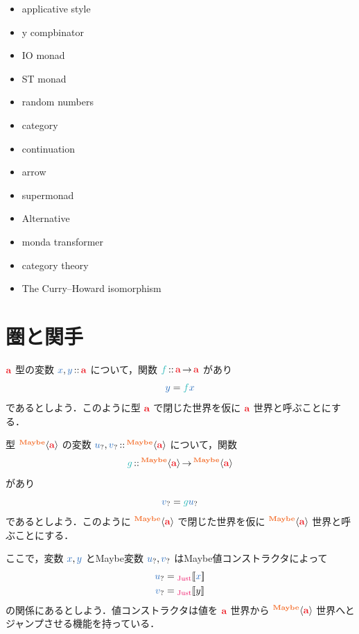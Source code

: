 \documentclass[a5paper,twoside,fleqn,draft]{jsbook}
\begin{document}
\begin{itemize}
\item applicative style
\item y compbinator
\item IO monad
\item ST monad
\item random numbers
\item category
\item continuation
\item arrow
\item supermonad
\item Alternative
\item monda transformer
\item category theory
\item The Curry–Howard isomorphism
\end{itemize}


\section{圏と関手}

$\hTypeName{a}$ 型の変数 $\hVar{x},\hVar{y}\hIsTypeOf\hTypeName{a}$ について，関数 $\hFunc{f}\hIsTypeOf\hTypeName{a}\hFunctionArrow\hTypeName{a}$ があり
\begin{equation}
  \hVar{y}
  =\hFunc{f}\hVar{x}
\end{equation}
であるとしよう．このように型 $\hTypeName{a}$ で閉じた世界を仮に $\hTypeName{a}$ 世界と呼ぶことにする．

型 $\hMaybeConstruct{\hTypeName{a}}$ の変数 $\hMaybeVar{u},\hMaybeVar{v}\hIsTypeOf\hMaybeConstruct{\hTypeName{a}}$ について，関数
\begin{equation}
  \hFunc{g}
  \hIsTypeOf\hMaybeConstruct{\hTypeName{a}}\hFunctionArrow\hMaybeConstruct{\hTypeName{a}}
\end{equation}
があり
\begin{equation}
  \hMaybeVar{v}
  =\hFunc{g}\hMaybeVar{u}
\end{equation}
であるとしよう．このように $\hMaybeConstruct{\hTypeName{a}}$ で閉じた世界を仮に $\hMaybeConstruct{\hTypeName{a}}$ 世界と呼ぶことにする．

ここで，変数 $\hVar{x},\hVar{y}$ とMaybe変数 $\hMaybeVar{u},\hMaybeVar{v}$ はMaybe値コンストラクタによって
\begin{align}
  \hMaybeVar{u}
  &=\hJustWith{\hVar{x}}\\
  \hMaybeVar{v}
  &=\hJustWith{y}
\end{align}
の関係にあるとしよう．値コンストラクタは値を $\hTypeName{a}$ 世界から $\hMaybeConstruct{\hTypeName{a}}$ 世界へとジャンプさせる機能を持っている．
\end{document}
